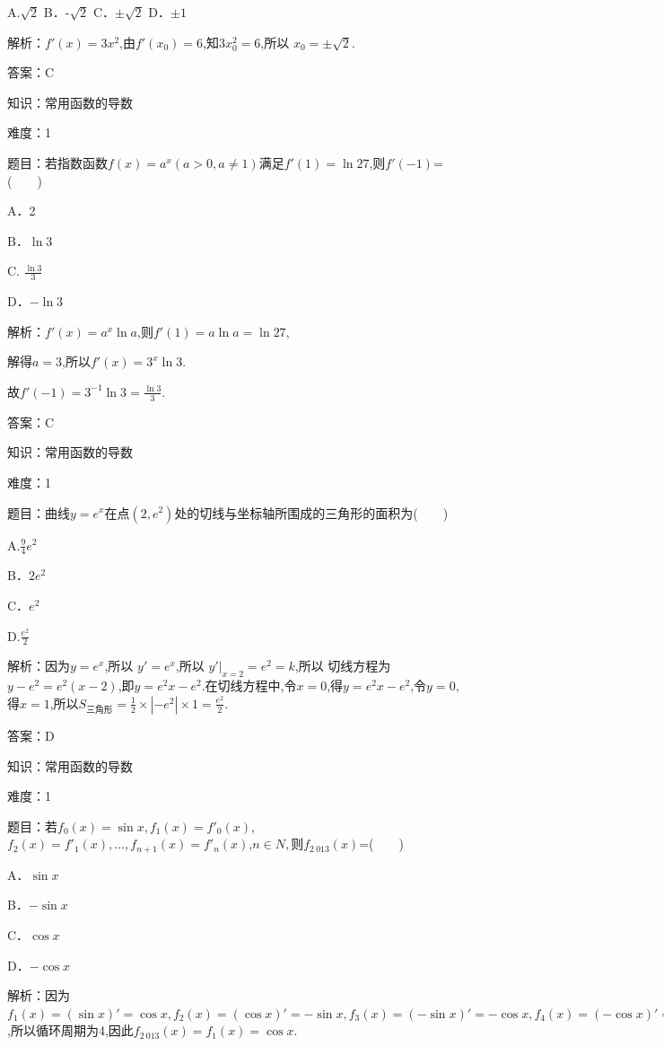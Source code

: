 \documentclass{article} %
\begin{document}
A.$\sqrt{2}$  B．-$\sqrt{2}$  C．$\pm\sqrt{2}$  D．$\pm1$

解析：$f'(x)=3x^{2}$,由$f'(x_{0})=6$,知$3x_0^2=6$,所以 $x_{0}=\pm\sqrt{2}$.

答案：C

知识：常用函数的导数

难度：1

题目：若指数函数$f(x)=a^{x}(a>0,a\neq1)$满足$f'(1)=\ln 27$,则$f'(-1)$=(　　)

A．2   

B．$\ln 3$

C. $\frac{\ln 3}{3}$  

D．$-\ln 3$

解析：$f'(x)=a^{x}\ln a$,则$f'(1)=a\ln a=\ln 27$,

解得$a=3$,所以$f'(x)=3^{x}\ln 3$.

故$f'(-1)=3^{-1}\ln 3=\frac{\ln 3}{3}$.

答案：C



知识：常用函数的导数

难度：1

题目：曲线$y=e^{x}$在点$(2,e^{2})$处的切线与坐标轴所围成的三角形的面积为(　　)

A.$\frac{9}{4}e^{2}$  

B．$2e^{2}$  

C．$e^{2}$  

D.$\frac{e^2}{2}$

解析：因为$y=e^{x}$,所以 $y'=e^{x}$,所以 $y'|_{x=2}=e^{2}=k$,所以 切线方程为$y-e^{2}=e^{2}(x-2)$,即$y=e^{2}x-e^{2}$.在切线方程中,令$x=0$,得$y=e^2x-e^{2}$,令$y=0$,得$x=1$,所以$ S_{\text{三角形}}=\frac{1}{2}\times |-e^{2}|\times 1=\frac{e^2}{2}$.

答案：D



知识：常用函数的导数

难度：1

题目：若$f_{0}(x)=\sin x,f_{1}(x)=f'_{0}(x)$,$f_{2}(x)=f'_{1}(x),{\dots},f_{n+1}(x)=f'_{n}(x)$,$n\in N,则f_{2\ 013}(x)$=(　　)

A．$\sin x   $

B．$-\sin x$

C．$\cos x   $

D．$-\cos x$

解析：因为$f_{1}(x)=(\sin x)'=\cos x,f_{2}(x)=(\cos x)'=-\sin x,f_{3}(x)=(-\sin x)'=-\cos x,f_{4}(x)=(-\cos x)'=\sin x,f_{5}(x)=(\sin x)'=\cos x$,所以循环周期为4,因此$f_{2\ 013}(x)=f_{1}(x)=\cos x$.
\end{document}
